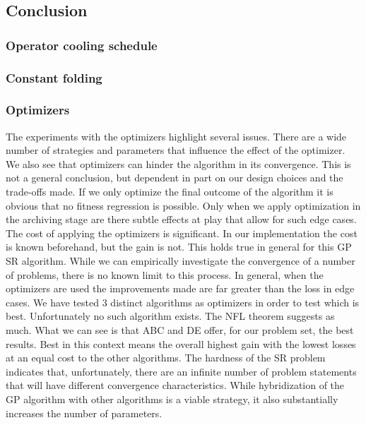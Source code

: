 \subsection{Conclusion}
\subsubsection{Operator cooling schedule}
\subsubsection{Constant folding}
\subsubsection{Optimizers}
The experiments with the optimizers highlight several issues. There are a wide number of strategies and parameters that influence the effect of the optimizer. We also see that optimizers can hinder the algorithm in its convergence. This is not a general conclusion, but dependent in part on our design choices and the trade-offs made. If we only optimize the final outcome of the algorithm it is obvious that no fitness regression is possible. Only when we apply optimization in the archiving stage are there subtle effects at play that allow for such edge cases. The cost of applying the optimizers is significant. In our implementation the cost is known beforehand, but the gain is not. This holds true in general for this GP SR algorithm. While we can empirically investigate the convergence of a number of problems, there is no known limit to this process. 
In general, when the optimizers are used the improvements made are far greater than the loss in edge cases. We have tested 3 distinct algorithms as optimizers in order to test which is best. Unfortunately no such algorithm exists. The NFL theorem \cite{NFL} suggests as much. What we can see is that ABC and DE offer, for our problem set, the best results. Best in this context means the overall highest gain with the lowest losses at an equal cost to the other algorithms. The hardness of the SR problem indicates that, unfortunately, there are an infinite number of problem statements that will have different convergence characteristics. While hybridization of the GP algorithm with other algorithms is a viable strategy, it also substantially increases the number of parameters. 